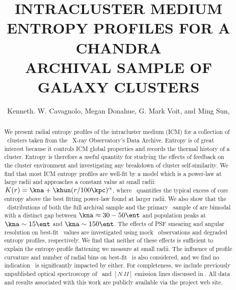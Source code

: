 \documentclass{emulateapj}
\begin{document}
\title{INTRACLUSTER MEDIUM ENTROPY PROFILES FOR A CHANDRA\\ARCHIVAL SAMPLE OF GALAXY CLUSTERS}
\author{
  Kenneth. W. Cavagnolo, Megan
  Donahue, G. Mark Voit, and Ming
  Sun,}
\journalinfo{}


\begin{abstract}
   We present radial entropy profiles of the intracluster medium (ICM)
   for a collection of \numcluster\ clusters taken from the
   \chandra\ X-ray Observatory's Data Archive. Entropy is of great
   interest because it controls ICM global properties and records the
   thermal history of a cluster. Entropy is therefore a useful
   quantity for studying the effects of feedback on the cluster
   environment and investigating any breakdown of cluster
   self-similarity. We find that most ICM entropy profiles are
   well-fit by a model which is a power-law at large radii and
   approaches a constant value at small radii: $K(r) = \kna + \khun
   (r/100 \kpc)^{\alpha}$, where \kna\ quantifies the typical excess
   of core entropy above the best fitting power-law found at larger
   radii. We also show that the \kna\ distributions of both the full
   archival sample and the primary \hifl\ sample of \citet{hiflugcs1}
   are bimodal with a distinct gap between $\kna \approx 30-50 \ent$
   and population peaks at $\kna \sim 15 \ent$ and $\kna \sim 150
   \ent$. The effects of PSF smearing and angular resolution on
   best-fit \kna\ values are investigated using mock
   \chandra\ observations and degraded entropy profiles,
   respectively. We find that neither of these effects is sufficient
   to explain the entropy-profile flattening we measure at small
   radii. The influence of profile curvature and number of radial bins
   on best-fit \kna\ is also considered, and we find no indication
   \kna\ is significantly impacted by either. For completeness, we
   include previously unpublished optical spectroscopy of \halpha\ and
   $[N~II]$ emission lines discussed in \citet{haradent}. All data and
   results associated with this work are publicly available via the
   project web site.
\end{abstract}
\end{document}

